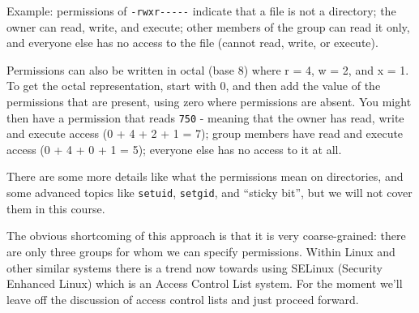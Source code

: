 Example: permissions of \texttt{-rwxr{-}{-}{-}{-}{-}} indicate that a file is not a directory; the owner can read, write, and execute; other members of the group can read it only, and everyone else has no access to the file (cannot read, write, or execute).

Permissions can also be written in octal (base 8) where r = 4, w = 2, and x = 1. To get the octal representation, start with 0, and then add the value of the  permissions that are present, using zero where permissions are absent. You might then have a permission that reads \texttt{750} - meaning that the owner has read, write and execute access (0 + 4 + 2 + 1 = 7); group members have read and execute access (0 + 4 + 0 + 1 = 5); everyone else has no access to it at all.

There are some more details like what the permissions mean on directories, and some advanced topics like \texttt{setuid}, \texttt{setgid}, and ``sticky bit'', but we will not cover them in this course.

The obvious shortcoming of this approach is that it is very coarse-grained: there are only three groups for whom we can specify permissions. Within Linux and other similar systems there is a trend now towards using SELinux (Security Enhanced Linux) which is an Access Control List system. For the moment we'll leave off the discussion of access control lists and just proceed forward.




